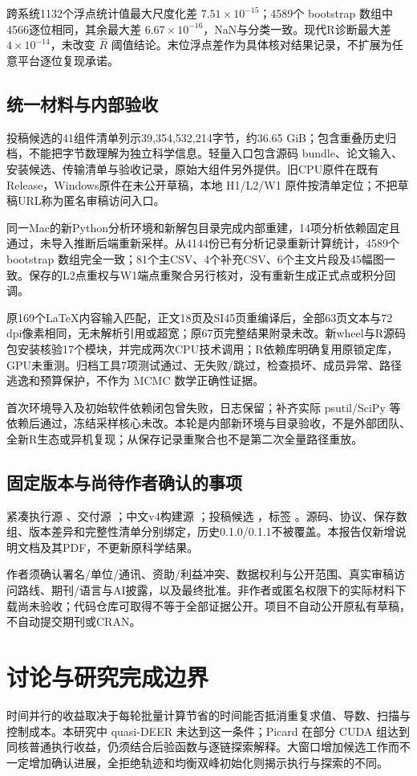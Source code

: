 \documentclass[UTF8,zihao=-4,a4paper,fontset=fandol]{ctexart}
\begin{document}
跨系统1132个浮点统计值最大尺度化差 $7.51\times10^{-15}$；4589个 bootstrap 数组中4566逐位相同，其余最大差 $6.67\times10^{-16}$，NaN与分类一致。现代R诊断最大差 $4\times10^{-14}$，未改变 $\hat R$ 阈值结论。末位浮点差作为具体核对结果记录，不扩展为任意平台逐位复现承诺。

\subsection{统一材料与内部验收}
投稿候选的41组件清单列示39,354,532,214字节，约36.65 GiB；包含重叠历史归档，不能把字节数理解为独立科学信息。轻量入口包含源码 bundle、论文输入、安装候选、传输清单与验收记录，原始大组件另外提供。旧CPU原件在既有 Release，Windows原件在未公开草稿，本地 H1/L2/W1 原件按清单定位；不把草稿URL称为匿名审稿访问入口。

同一Mac的新Python分析环境和新解包目录完成内部重建，14项分析依赖固定且  通过，未导入推断后端重新采样。从4144份已有分析记录重新计算统计，4589个 bootstrap 数组完全一致；81个主CSV、4个补充CSV、6个主文片段及45幅图一致。保存的L2点重权与W1端点重聚合另行核对，没有重新生成正式点或积分回调。

原169个LaTeX内容输入匹配，正文18页及SI45页重编译后，全部63页文本与72 dpi像素相同，无未解析引用或超宽；原67页完整结果附录未改。新wheel与R源码包安装核验17个模块，并完成两次CPU技术调用；R依赖库明确复用原锁定库，GPU未重测。归档工具7项测试通过、无失败/跳过，检查损坏、成员异常、路径逃逸和预算保护，不作为 MCMC 数学正确性证据。

首次环境导入及初始软件依赖闭包曾失败，日志保留；补齐实际 psutil/SciPy 等依赖后通过，冻结采样核心未改。本轮是内部新环境与目录验收，不是外部团队、全新R生态或异机复现；从保存记录重聚合也不是第二次全量路径重放。

\subsection{固定版本与尚待作者确认的事项}
紧凑执行源 、交付源 ；中文v4构建源 ；投稿候选 ，标签 。源码、协议、保存数组、版本差异和完整性清单分别绑定，历史0.1.0/0.1.1不被覆盖。本报告仅新增说明文档及其PDF，不更新原科学结果。

作者须确认署名/单位/通讯、资助/利益冲突、数据权利与公开范围、真实审稿访问路线、期刊/语言与AI披露，以及最终批准。非作者或匿名权限下的实际材料下载尚未验收；代码仓库可取得不等于全部证据公开。项目不自动公开原私有草稿，不自动提交期刊或CRAN。

\section{讨论与研究完成边界}
时间并行的收益取决于每轮批量计算节省的时间能否抵消重复求值、导数、扫描与控制成本。本研究中 quasi-DEER 未达到这一条件；Picard 在部分 CUDA 组达到同核普通执行收益，仍须结合后验函数与逐链探索解释。大窗口增加候选工作而不一定增加确认进展，全拒绝轨迹和均衡双峰初始化则揭示执行与探索的不同。
\end{document}
